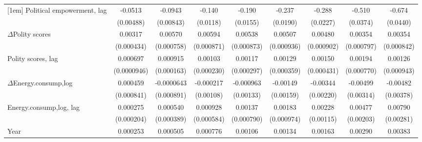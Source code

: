 \begin{table}[htbp]
\begin{tabular}{l*{8}{c}}
[1em]
Political empowerment, lag  &     -0.0513\sym{***}&     -0.0943\sym{***}&      -0.140\sym{***}&      -0.190\sym{***}&      -0.237\sym{***}&      -0.288\sym{***}&      -0.510\sym{***}&      -0.674\sym{***}\\
                    &   (0.00488)         &   (0.00843)         &    (0.0118)         &    (0.0155)         &    (0.0190)         &    (0.0227)         &    (0.0374)         &    (0.0440)         \\
[1em]
$\Delta$Polity scores            &     0.00317\sym{***}&     0.00570\sym{***}&     0.00594\sym{***}&     0.00538\sym{***}&     0.00507\sym{***}&     0.00480\sym{***}&     0.00354\sym{***}&     0.00354\sym{***}\\
                    &  (0.000434)         &  (0.000758)         &  (0.000871)         &  (0.000873)         &  (0.000936)         &  (0.000902)         &  (0.000797)         &  (0.000842)         \\
[1em]
Polity scores, lag         &    0.000697\sym{***}&    0.000915\sym{***}&     0.00103\sym{***}&     0.00117\sym{***}&     0.00129\sym{***}&     0.00150\sym{***}&     0.00194\sym{**} &     0.00126         \\
                    & (0.0000946)         &  (0.000163)         &  (0.000230)         &  (0.000297)         &  (0.000359)         &  (0.000431)         &  (0.000770)         &  (0.000943)         \\
[1em]
$\Delta$Energy.consump,log             &    0.000459         &  -0.0000643         &   -0.000217         &   -0.000963         &    -0.00149         &    -0.00344         &    -0.00499         &    -0.00482         \\
                    &  (0.000841)         &  (0.000891)         &   (0.00108)         &   (0.00133)         &   (0.00159)         &   (0.00220)         &   (0.00314)         &   (0.00378)         \\
[1em]
Energy.consump,log, lag            &    0.000275         &    0.000540         &    0.000928         &     0.00137\sym{*}  &     0.00183\sym{*}  &     0.00228\sym{**} &     0.00477\sym{**} &     0.00790\sym{***}\\
                    &  (0.000204)         &  (0.000389)         &  (0.000584)         &  (0.000790)         &  (0.000974)         &   (0.00115)         &   (0.00203)         &   (0.00281)         \\
[1em]
Year                &    0.000253\sym{***}&    0.000505\sym{***}&    0.000776\sym{***}&     0.00106\sym{***}&     0.00134\sym{***}&     0.00163\sym{***}&     0.00290\sym{***}&     0.00383\sym{***}\\

\end{tabular}
\end{table}
